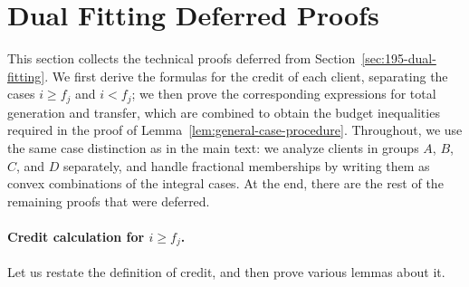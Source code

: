 \section{Dual Fitting Deferred Proofs}\label{sec:dual-deferred-proofs}

This section collects the technical proofs deferred from Section~\ref{sec:195-dual-fitting}. We first derive the formulas for the credit of each client, separating the cases $i \geq f_j$ and $i < f_j$; we then prove the corresponding expressions for total generation and transfer, which are combined to obtain the budget inequalities required in the proof of Lemma~\ref{lem:general-case-procedure}. Throughout, we use the same case distinction as in the main text: we analyze clients in groups $A$, $B$, $C$, and $D$ separately, and handle fractional memberships by writing them as convex combinations of the integral cases. At the end, there are the rest of the remaining proofs that were deferred.

\paragraph{Credit calculation for \texorpdfstring{$i \geq f_j$}{i >=f\_j}.}

Let us restate the definition of credit, and then prove various lemmas about it.


